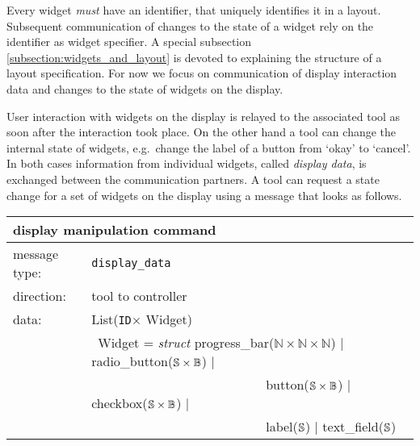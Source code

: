 \documentclass{article}
\newcommand{\msg}[1]{\texttt{#1}}
\newcommand{\String}{\ensuremath \mathbb{S}\xspace}
\newcommand{\Id}{\texttt{ID}\xspace}
\begin{document}
   \noindent Every widget \emph{must} have an identifier, that uniquely
   identifies it in a layout.  Subsequent communication of changes to the state
   of a widget rely on the identifier as widget specifier. A special subsection
   \ref{subsection:widgets_and_layout} is devoted to explaining the structure
   of a layout specification. For now we focus on communication of display
   interaction data and changes to the state of widgets on the display.

   User interaction with widgets on the display is relayed to the
   associated tool as soon after the interaction took place. On the other
   hand a tool can change the internal state of widgets, e.g.\ change the label
   of a button from `okay' to `cancel'. In both cases information from
   individual widgets, called \textit{display data}, is exchanged between the
   communication partners. A tool can request a state change for a set of
   widgets on the display using a message that looks as follows.

   \begin{table}[H]
    \begin{center}
     \begin{tabular}{|ll|}
      \hline
       \multicolumn{2}{|l|}{\textbf{display manipulation command}} \\
      \hline
       message type:   & \msg{display\_data} \\
      \hline
       direction:      & tool to controller \\
      \hline
       data:           & List(\Id $\times$ Widget) \\
                       & \ Widget = \textit{struct} progress\_bar($\mathbb{N} \times \mathbb{N} \times \mathbb{N}$) $|$
                                                    radio\_button($\String \times \mathbb{B}$) $|$ \\
                       & \ \ \ \ \ \ \ \ \ \ \ \ \ \ \ \ \ \ \ \ \ \ \ \ \ \ \
                                                    button($\String \times \mathbb{B}$) $|$
                                                    checkbox($\String \times \mathbb{B}$) $|$ \\
                       & \ \ \ \ \ \ \ \ \ \ \ \ \ \ \ \ \ \ \ \ \ \ \ \ \ \ \
                                                    label($\String$) $|$
                                                    text\_field($\String$) \\
      \hline
     \end{tabular}
    \end{center}
   \vspace{-0.4cm}
   \end{table}
\end{document}
